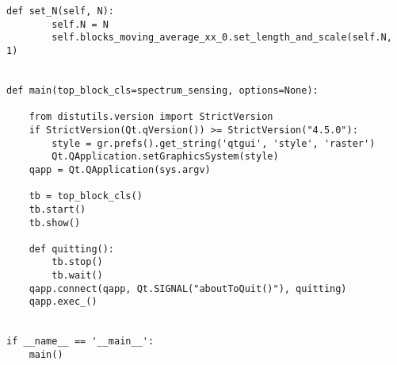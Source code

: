 \begin{lstlisting}[breaklines]
    def set_N(self, N):
        self.N = N
        self.blocks_moving_average_xx_0.set_length_and_scale(self.N, 1)


def main(top_block_cls=spectrum_sensing, options=None):

    from distutils.version import StrictVersion
    if StrictVersion(Qt.qVersion()) >= StrictVersion("4.5.0"):
        style = gr.prefs().get_string('qtgui', 'style', 'raster')
        Qt.QApplication.setGraphicsSystem(style)
    qapp = Qt.QApplication(sys.argv)

    tb = top_block_cls()
    tb.start()
    tb.show()

    def quitting():
        tb.stop()
        tb.wait()
    qapp.connect(qapp, Qt.SIGNAL("aboutToQuit()"), quitting)
    qapp.exec_()


if __name__ == '__main__':
    main()
\end{lstlisting}


